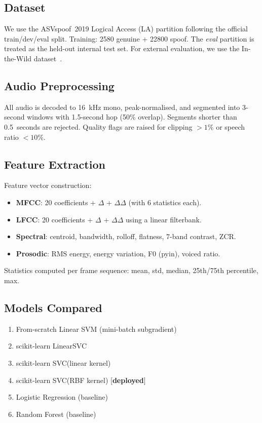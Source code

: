 \documentclass[conference]{IEEEtran}
\begin{document}
\subsection{Dataset}
We use the ASVspoof~2019 Logical Access (LA) partition following the official
train/dev/eval split. Training: 2580 genuine + 22800 spoof. The \emph{eval}
partition is treated as the held-out internal test set. For external evaluation,
we use the In-the-Wild dataset~\cite{muller2022}.

\subsection{Audio Preprocessing}
All audio is decoded to 16~kHz mono, peak-normalised, and segmented into 3-second
windows with 1.5-second hop (50\% overlap). Segments shorter than 0.5~seconds are
rejected. Quality flags are raised for clipping $>1\%$ or speech ratio $<10\%$.

\subsection{Feature Extraction}
Feature vector construction:
\begin{itemize}
  \item \textbf{MFCC}: 20 coefficients + $\Delta$ + $\Delta\Delta$ (with 6 statistics each).
  \item \textbf{LFCC}: 20 coefficients + $\Delta$ + $\Delta\Delta$ using a linear filterbank.
  \item \textbf{Spectral}: centroid, bandwidth, rolloff, flatness, 7-band contrast, ZCR.
  \item \textbf{Prosodic}: RMS energy, energy variation, F0 (pyin), voiced ratio.
\end{itemize}
Statistics computed per frame sequence: mean, std, median, 25th/75th percentile, max.

\subsection{Models Compared}
\begin{enumerate}
  \item From-scratch Linear SVM (mini-batch subgradient)
  \item scikit-learn LinearSVC
  \item scikit-learn SVC(linear kernel)
  \item scikit-learn SVC(RBF kernel) [\textbf{deployed}]
  \item Logistic Regression (baseline)
  \item Random Forest (baseline)
\end{enumerate}
\end{document}
